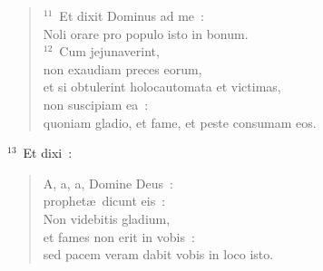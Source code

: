 \begin{verse}
${}^{11}$~Et dixit Dominus ad me~:\\ Noli orare pro populo isto in bonum.\\
${}^{12}$~Cum jejunaverint,\\ non exaudiam preces eorum,\\ et si obtulerint holocautomata et victimas,\\ non suscipiam ea~:\\ quoniam gladio, et fame, et peste consumam eos.\end{verse}


${}^{13}$~Et dixi~: \begin{verse}A, a, a, Domine Deus~:\\ prophet\ae\ dicunt eis~:\\ Non videbitis gladium,\\ et fames non erit in vobis~:\\ sed pacem veram dabit vobis in loco isto.\end{verse}


